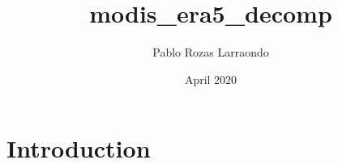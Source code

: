 \documentclass{article}
\title{modis_era5_decomp}
\author{Pablo Rozas Larraondo}
\date{April 2020}
\begin{document}
\maketitle

\section{Introduction}
\end{document}
